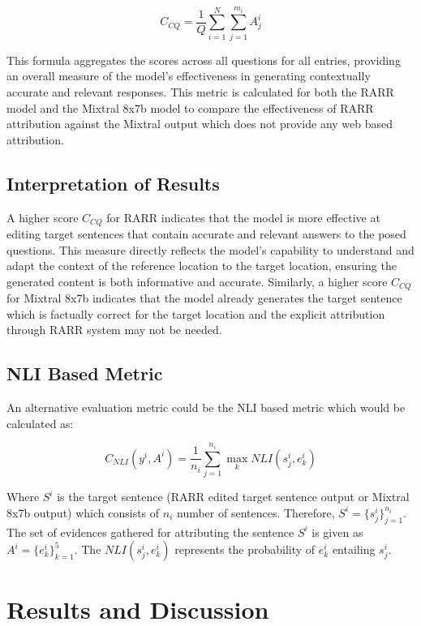 \documentclass[11pt]{article}
\begin{document}
	\begin{equation}
		C_{CQ} = \frac{1}{Q} \sum_{i=1}^{N} \sum_{j=1}^{m_i} A_j^i
	\end{equation}
	
	This formula aggregates the scores across all questions for all entries, providing an overall measure of the model’s effectiveness in generating contextually accurate and relevant responses. This metric is calculated for both the RARR model and the Mixtral 8x7b model to compare the effectiveness of RARR attribution against the Mixtral output which does not provide any web based attribution.
	
	\subsection{Interpretation of Results}
	
	A higher score $C_{CQ}$ for RARR indicates that the model is more effective at editing target sentences that contain accurate and relevant answers to the posed questions. This measure directly reflects the model's capability to understand and adapt the context of the reference location to the target location, ensuring the generated content is both informative and accurate. Similarly, a higher score $C_{CQ}$ for Mixtral 8x7b indicates that the model already generates the target sentence which is factually correct for the target location and the explicit attribution through RARR system may not be needed.
	
	\subsection{NLI Based Metric}
	An alternative evaluation metric could be the NLI based metric which would be calculated as:
	
	\begin{equation}
		C_{NLI} (y^i, A^i) = \frac{1}{n_i} \sum_{j=1}^{n_i} \max_k NLI(s_j^i, e_k^i)
	\end{equation}
	
	Where $S^i$ is the target sentence (RARR edited target sentence output or Mixtral 8x7b output) which consists of $n_i$ number of sentences. Therefore, $S^i = \{s_j^i\}_{j=1}^{n_i}$. The set of evidences gathered for attributing the sentence $S^i$ is given as $A^i = \{e^i_k\}_{k=1}^5$. The $NLI(s_j^i, e_k^i)$ represents the probability of $e^i_k$ entailing $s^i_j$.
	
	\section{Results and Discussion}
	
\end{document}
